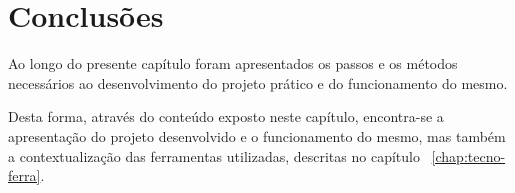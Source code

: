 \section{Conclusões}
\label{chap3:sec:concs}
Ao longo do presente capítulo foram apresentados os passos e os métodos necessários ao desenvolvimento do projeto prático e do funcionamento do mesmo. 

Desta forma, através do conteúdo exposto neste capítulo, encontra-se a apresentação do projeto desenvolvido e o funcionamento do mesmo, mas também a contextualização das ferramentas utilizadas, descritas no capítulo ~\ref{chap:tecno-ferra}.